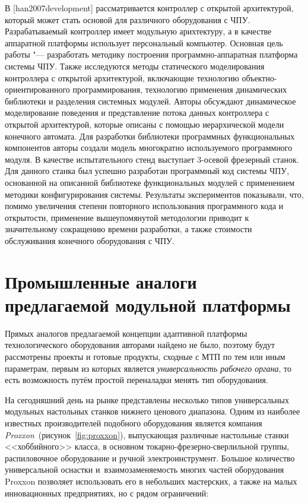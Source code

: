 В [han2007development] рассматривается контроллер с открытой архитектурой, который может стать основой для различного оборудования с ЧПУ. Разрабатываемый контроллер имеет модульную арихтектуру, а в качестве аппаратной платформы использует персональный компьютер. Основная цель работы "--- разработать методику построения программно-аппаратная платформа системы ЧПУ. Также исследуются методы статического моделирования контроллера с открытой архитектурой, включающие технологию объектно-ориентированного программирования, технологию применения динамических библиотеки и разделения системных модулей. Авторы обсуждают динамическое моделирование поведения и представление потока данных контроллера с открытой архитектурой, которые описаны с помощью иерархической модели конечного автомата. Для разработки библиотеки программных функциональных компонентов авторы создали модель многократно используемого программного модуля. В качестве испытательного стенд выступает 3-осевой фрезерный станок. Для данного станка был успешно разработан программный код системы ЧПУ, основанной на описанной библиотеке функциональных модулей с применением методики конфигурирования системы. Результаты экспериментов показывали, что, помимо увеличения степени повторного использования программного кода и открытости, применение вышеупомянутой методологии приводит к значительному сокращению времени разработки, а также стоимости обслуживания конечного оборудования с ЧПУ.

\section{Промышленные аналоги предлагаемой модульной платформы}

Прямых аналогов предлагаемой концепции адаптивной платформы технологического оборудования авторами найдено не было, поэтому будут рассмотрены проекты и готовые продукты, сходные с МТП по тем или иным параметрам, первым из которых является \textit{универсальность рабочего органа}, то есть возможность путём простой переналадки менять тип оборудования. 

На сегодняшний день на рынке представлены несколько типов универсальных модульных настольных станков нижнего ценового диапазона. Одним из наиболее известных производителей подобного оборудования является компания \textit{Proxxon}~(рисунок~\cref{fig:proxxon}), выпускающая различные настольные станки <<хоббийного>> класса, в основном токарно-фрезерно-сверлильной группы, распиловочное оборудование и ручной электроинструмент. Большое количество универсальной оснастки и~взаимозаменяемость многих частей оборудования Proxxon позволяет использовать его в небольших мастерских, а также на малых инновационных предприятиях, но с рядом ограничений:

